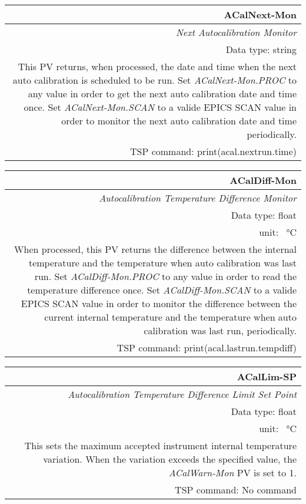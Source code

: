 \documentclass[openany]{article}
\begin{document}
		\begin{tabular}{N}
			\hline
			\bfseries ACalNext-Mon\label{pv:acalnext-mon} \\ \hline
			\emph{Next Autocalibration Monitor} \\
			Data type: string \\
			This PV returns, when processed, the date and time when the next auto calibration is scheduled to be run. Set \emph{ACalNext-Mon.PROC} to any value in order to get the next auto calibration date and time once. Set \emph{ACalNext-Mon.SCAN} to a valide EPICS SCAN value in order to monitor the next auto calibration date and time periodically. \\
			TSP command: print(acal.nextrun.time)
		\end{tabular}

		\begin{tabular}{N}
			\hline
			\bfseries ACalDiff-Mon\label{pv:acaldiff-mon} \\ \hline
			\emph{Autocalibration Temperature Difference Monitor} \\
			Data type: float \\
			unit: \SI{}{\degreeCelsius} \\
			When processed, this PV returns the difference between the internal temperature and the temperature when auto calibration was last run. Set \emph{ACalDiff-Mon.PROC} to any value in order to read the temperature difference once. Set \emph{ACalDiff-Mon.SCAN} to a valide EPICS SCAN value in order to monitor the difference between the current internal temperature and the temperature when auto calibration was last run, periodically. \\
			TSP command: print(acal.lastrun.tempdiff)
		\end{tabular}

		\begin{tabular}{N}
			\hline
			\bfseries ACalLim-SP\label{pv:acallim-sp} \\ \hline
			\emph{Autocalibration Temperature Difference Limit Set Point} \\
			Data type: float \\
			unit: \SI{}{\degreeCelsius} \\
			This sets the maximum accepted instrument internal temperature variation. When the variation exceeds the specified value, the \emph{ACalWarn-Mon} PV is set to 1. \\
			TSP command: No command
		\end{tabular}
\end{document}
